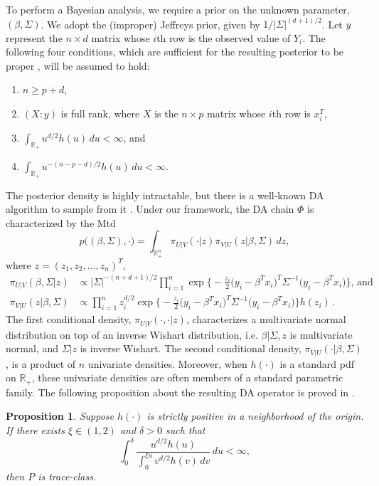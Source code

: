 \documentclass[11pt]{article}
\newtheorem{proposition}{Proposition}
\begin{document}
        To perform a Bayesian analysis, we require a prior on the
        unknown parameter, $(\beta,\Sigma)$.  We adopt the (improper)
        Jeffreys prior, given by $1/|\Sigma|^{(d+1)/2}$.  Let $y$
        represent the $n \times d$ matrix whose $i$th row is the
        observed value of $Y_i$.  The following four conditions, which
        are sufficient for the resulting posterior to be proper
        \citep{qin2016trace, fernandez1999multivariate}, will be
        assumed to hold:
	\begin{enumerate}
		\item $n \geq p + d$,
		\item $(X:y)$ is full rank, where $X$ is the $n\times
                  p$ matrix whose $i$th row is $x_i^T$,
		\item
		$
		\int_{\mathbb{R}_+} u^{d/2} h(u) \, du < \infty
		$, and
		\item
		$
		\int_{\mathbb{R}_+} u^{-(n-p-d)/2} h(u) \, du < \infty
		$.
	\end{enumerate}
	The posterior density is highly intractable, but there is a
        well-known DA algorithm to sample from it
        \citep{liu1996bayesian}. Under our framework, the DA chain
        $\Phi$ is characterized by the Mtd
	\[
	p\big((\beta,\Sigma),\cdot \big) = \int_{\mathbb{R}_+^n} \pi_{U|V}(\cdot| z) \pi_{V|U}(z|\beta,\Sigma) \, dz,
	\]
	where $z=(z_1,z_2,\dots,z_n)^T$,
	\[
	\begin{aligned}
          \pi_{U|V}(\beta,\Sigma|z) & \propto |\Sigma|^{-(n+d+1)/2} \prod_{i=1}^{n}\exp \Big\{ -\frac{z_i}{2} \big(y_i-\beta^Tx_i \big)^T \Sigma^{-1} \big(y_i-\beta^Tx_i \big) \Big\}, \, \mbox{and} \\
          \pi_{V|U}(z|\beta,\Sigma) & \propto \prod_{i=1}^{n}
          z_i^{d/2} \exp \Big\{ -\frac{z_i}{2} \big(y_i-\beta^Tx_i
          \big)^T \Sigma^{-1} \big(y_i-\beta^Tx_i \big) \Big\} h(z_i)
          \,.
	\end{aligned}
	\]
	The first conditional density, $\pi_{U|V}(\cdot,\cdot|z)$,
        characterizes a multivariate normal distribution on top of an
        inverse Wishart distribution, i.e. $\beta|\Sigma,z$ is
        multivariate normal, and $\Sigma|z$ is inverse Wishart.  The
        second conditional density, $\pi_{V|U}(\cdot|\beta,\Sigma)$,
        is a product of $n$ univariate densities.  Moreover, when
        $h(\cdot)$ is a standard pdf on $\mathbb{R}_+$, these
        univariate densities are often members of a standard
        parametric family.  The following proposition about the
        resulting DA operator is proved in \cite{qin2016trace}.
	\begin{proposition} \label{nongaussian} Suppose $h(\cdot)$ is
          strictly positive in a neighborhood of the origin. If there
          exists $\xi \in (1,2)$ and $\delta>0$ such that
		\[
		\int_{0}^{\delta} \frac{u^{d/2}h(u)}{\int_{0}^{\xi u} v^{d/2} h(v) \, dv} \, du < \infty, 
		\]
		then $P$ is trace-class.
	\end{proposition}
	
\end{document}
